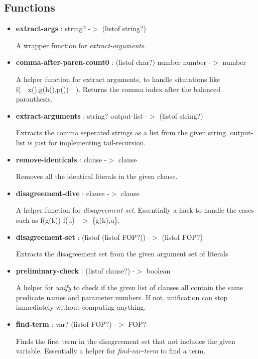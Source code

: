 \documentclass[11pt]{report}
\begin{document}
\begin{appendices}
\subsection{Functions}

\begin{itemize}
 \item \textbf{extract-args} : string? -$>$ (listof string?)

A wrapper function for \textit{extract-arguments}.

 \item \textbf{comma-after-paren-count0} : (listof char?) number number -$>$ number

A helper function for extract arguments, to handle situtations like f(\ \ x(),g(h(),p())\ \ ). Returns the comma index after the balanced paranthesis.

 \item \textbf{extract-arguments} : string? output-list -$>$ (listof string?)

Extracts the comma seperated strings as a list from the given string. output-list is just for implementing tail-recursion.

 \item \textbf{remove-identicals} : clause -$>$ clause

Removes all the identical literals in the given clause.

 \item \textbf{disagreement-dive} : clause -$>$ clause

A helper function for \textit{disagreement-set}. Essentially a hack to handle the cases such as f(g(k)) f(u) --$>$ \{g(k),u\}. 

 \item \textbf{disagreement-set} : (listof (listof FOP?)) -$>$ (listof FOP?)

Extracts the disagreement set from the given argument set of literals

 \item \textbf{preliminary-check} : (listof clause?) -$>$ boolean

A helper for \textit{unify} to check if the given list of clauses all contain the same predicate names and parameter numbers. If not, unification can stop immediately without computing anything.

 \item \textbf{find-term} : var? (listof FOP?) -$>$ FOP?

Finds the first term in the disagreement set that not includes the given variable. Essentially a helper for \textit{find-var-term} to find a term.


\end{itemize}
\end{appendices}
\end{document}
